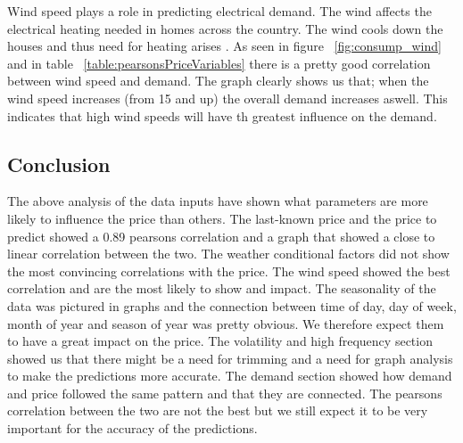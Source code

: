 Wind speed plays a role in predicting electrical demand. The wind affects the electrical heating needed in homes across the country. The wind cools down the houses and thus need for heating arises \cite{19}. As seen in figure ~\ref{fig:consump_wind} and in table ~\ref{table:pearsonsPriceVariables} there is a pretty good correlation between wind speed and demand. The graph clearly shows us that; when the wind speed increases (from 15 and up) the overall demand increases aswell. This indicates that high wind speeds will have th greatest influence on the demand.


\subsection{Conclusion}
The above analysis of the data inputs have shown what parameters are more likely to influence the price than others. The last-known price and the price to predict showed a 0.89 pearsons correlation and a graph that showed a close to linear correlation between the two. The weather conditional factors did not show the most convincing correlations with the price. The wind speed showed the best correlation and are the most likely to show and impact. The seasonality of the data was pictured in graphs and the connection between time of day, day of week, month of year and season of year was pretty obvious. We therefore expect them to have a great impact on the price. The volatility and high frequency section showed us that there might be a need for trimming and a need for graph analysis to make the predictions more accurate. The demand section showed how demand and price followed the same pattern and that they are connected. The pearsons correlation between the two are not the best but we still expect it to be very important for the accuracy of the predictions.